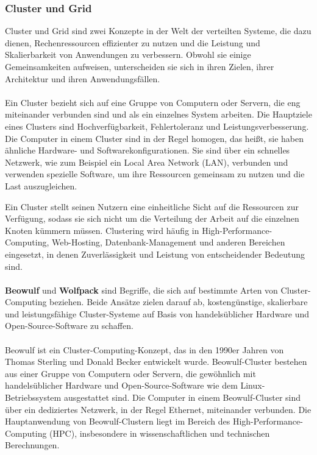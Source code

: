 \documentclass[../vs-script-first-v01.tex]{subfiles}
\begin{document}
\subsubsection{Cluster und Grid}

Cluster und Grid sind zwei Konzepte in der Welt der verteilten Systeme, die dazu dienen, Rechenressourcen effizienter zu nutzen und die Leistung und Skalierbarkeit von Anwendungen zu verbessern. Obwohl sie einige Gemeinsamkeiten aufweisen, unterscheiden sie sich in ihren Zielen, ihrer Architektur und ihren Anwendungsfällen.
\\\\
Ein Cluster bezieht sich auf eine Gruppe von Computern oder Servern, die eng miteinander verbunden sind und als ein einzelnes System arbeiten. Die Hauptziele eines Clusters sind Hochverfügbarkeit, Fehlertoleranz und Leistungsverbesserung. Die Computer in einem Cluster sind in der Regel homogen, das heißt, sie haben ähnliche Hardware- und Softwarekonfigurationen. Sie sind über ein schnelles Netzwerk, wie zum Beispiel ein Local Area Network (LAN), verbunden und verwenden spezielle Software, um ihre Ressourcen gemeinsam zu nutzen und die Last auszugleichen.

Ein Cluster stellt seinen Nutzern eine einheitliche Sicht auf die Ressourcen zur Verfügung, sodass sie sich nicht um die Verteilung der Arbeit auf die einzelnen Knoten kümmern müssen. Clustering wird häufig in High-Performance-Computing, Web-Hosting, Datenbank-Management und anderen Bereichen eingesetzt, in denen Zuverlässigkeit und Leistung von entscheidender Bedeutung sind.
\\\\
\textbf{Beowulf} und \textbf{Wolfpack} sind Begriffe, die sich auf bestimmte Arten von Cluster-Computing beziehen. Beide Ansätze zielen darauf ab, kostengünstige, skalierbare und leistungsfähige Cluster-Systeme auf Basis von handelsüblicher Hardware und Open-Source-Software zu schaffen.
\\\\
Beowulf ist ein Cluster-Computing-Konzept, das in den 1990er Jahren von Thomas Sterling und Donald Becker entwickelt wurde. Beowulf-Cluster bestehen aus einer Gruppe von Computern oder Servern, die gewöhnlich mit handelsüblicher Hardware und Open-Source-Software wie dem Linux-Betriebssystem ausgestattet sind. Die Computer in einem Beowulf-Cluster sind über ein dediziertes Netzwerk, in der Regel Ethernet, miteinander verbunden. Die Hauptanwendung von Beowulf-Clustern liegt im Bereich des High-Performance-Computing (HPC), insbesondere in wissenschaftlichen und technischen Berechnungen.
\end{document}
